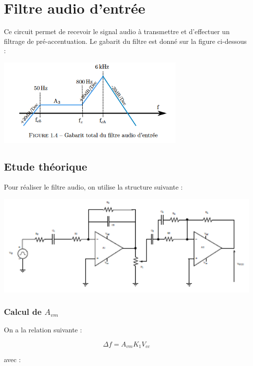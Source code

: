 \documentclass[a4paper]{report}
\begin{document}
\newpage
\chapter{Filtre audio d'entrée}

Ce circuit permet de recevoir le signal audio à transmettre et d'effectuer un filtrage de pré-accentuation. Le gabarit du filtre est donné sur la figure ci-dessous :

\begin{center}
\includegraphics[width=0.7\textwidth]{gabarit_total.PNG}
\end{center}

\section{Etude théorique}

Pour réaliser le filtre audio, on utilise la structure suivante :

\begin{center}
\includegraphics[width=1\textwidth]{montage_filtre_audio.PNG}
\end{center}

\subsection{Calcul de $A_{vm}$}

On a la relation suivante :

$$\Delta f = A_{vm}K_1V_{cc}$$

avec :\\
\end{document}
